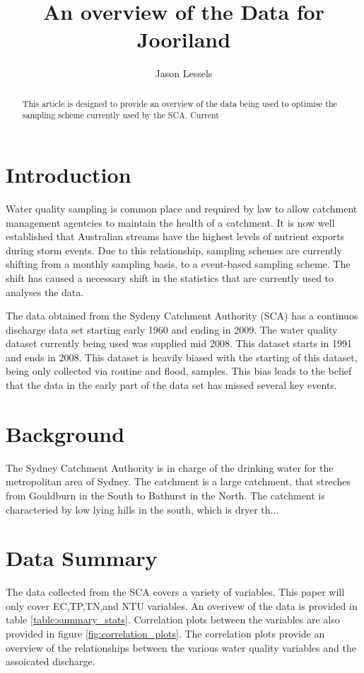 \documentclass[5p]{elsarticle}
\begin{document}
\begin{frontmatter}
\title{An overview of the Data for Jooriland}
\author[jsl]{Jason Lessels}
\address[jsl]{The University of Sydney}
\begin{abstract}
This article is designed to provide an overview of the data being used to optimise the sampling scheme currently used by the SCA. Current
\end{abstract}
\begin{keyword}
\end{keyword}

\end{frontmatter}
\section*{Introduction}
Water quality sampling is common place and required by law to allow catchment management agentcies to maintain the health of a catchment. It is now well established that Australian streams have the highest levels of nutrient exports during storm events. Due to this relationship, sampling schemes are currently shifting from a monthly sampling basis, to a event-based sampling scheme. The shift has caused a necessary shift in the statistics that are currently used to analyses the data.

The data obtained from the Sydeny Catchment Authority (SCA) has a continuos discharge data set starting early 1960 and ending in 2009. The water quality dataset currently being used was supplied mid 2008. This dataset starts in 1991 and ends in 2008. This dataset is heavily biased with the starting of this dataset, being only collected via routine and flood, samples. This bias leads to the belief that the data in the early part of the data set has missed several key events.
\section*{Background}
The Sydney Catchment Authority is in charge of the drinking water for the metropolitan area of Sydney. The catchment is a large catchment, that streches from Gouldburn in the South to Bathurst in the North. The catchment is characteried by low lying hills in the south, which is dryer th...

\section*{Data Summary}
The data collected from the SCA covers a variety of variables. This paper will only cover EC,TP,TN,and NTU variables. An overivew of the data is provided in table \ref{table:summary_stats}. Correlation plots between the variables are also provided in figure \ref{fig:correlation_plots}. The correlation plots provide an overview of the relationships between the various water quality variables and the assoicated discharge.
\end{document}
